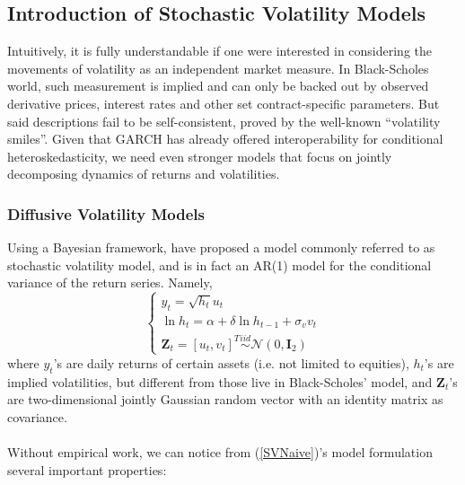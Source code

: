 \documentclass[letterpaper]{article}
\newcommand{\ZZ}{\mathbf{Z}}
\begin{document}
	\subsection{Introduction of Stochastic Volatility Models}
	Intuitively, it is fully understandable if one were interested in considering the movements of volatility as an independent market measure. In Black-Scholes world, such measurement is implied and can only be backed out by observed derivative prices, interest rates and other set contract-specific parameters. But said descriptions fail to be self-consistent, proved by the well-known ``volatility smiles''. Given that GARCH has already offered interoperability for conditional heteroskedasticity, we need even stronger models that focus on jointly decomposing dynamics of returns and volatilities.
	\subsubsection{Diffusive Volatility Models}
	Using a Bayesian framework, \citet{rossi1994bayesian} have proposed a model commonly referred to as stochastic volatility model, and is in fact an AR(1) model for the conditional variance of the return series. Namely,
	\begin{equation}\label{SVNaive}
	\begin{cases}
	y_t=\sqrt{h_t}u_t\\
	\ln h_t=\alpha+\delta\ln h_{t-1}+\sigma_v v_t\\
	\ZZ_t=[u_t,v_t]^{T}\stackrel{iid}{\sim}\mathcal{N}(0,\mathbf{I}_2)
	\end{cases}
	\end{equation}
	where $y_t$'s are daily returns of certain assets (i.e. not limited to equities), $h_t$'s are implied volatilities, but different from those live in Black-Scholes' model, and $\ZZ_t$'s are two-dimensional jointly Gaussian random vector with an identity matrix as covariance.\\\\
	Without empirical work, we can notice from (\ref{SVNaive})'s model formulation several important properties:
\end{document}
